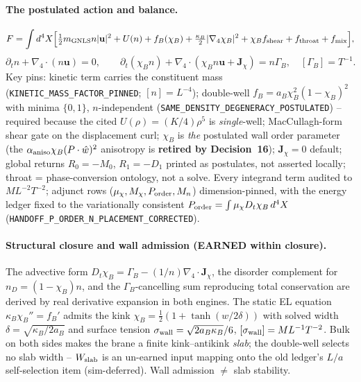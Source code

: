 \paragraph{The postulated action and balance.}
\[
  F=\int d^4X\Big[\tfrac12 m_{\mathrm{GNLS}} n|\mathbf u|^2+U(n)+f_B(\chi_B)
  +\tfrac{\kappa_B}{2}|\nabla_4\chi_B|^2+\chi_B f_{\rm shear}
  +f_{\rm throat}+f_{\rm mix}\Big],
\]
\[
  \partial_t n+\nabla_4\!\cdot\!(n\mathbf u)=0,\qquad
  \partial_t(\chi_B n)+\nabla_4\!\cdot\!(\chi_B n\mathbf u+\mathbf J_\chi)=n\Gamma_B,
  \quad [\Gamma_B]=T^{-1}.
\]
Key pins: kinetic term carries the constituent mass
(\texttt{KINETIC\_MASS\_FACTOR\_PINNED}; \([n]=L^{-4}\)); double-well
\(f_B=a_B\chi_B^2(1-\chi_B)^2\) with minima \(\{0,1\}\), \(n\)-independent
(\texttt{SAME\_DENSITY\_DEGENERACY\_POSTULATED}) -- required because the cited
\(U(\rho)=(K/4)\rho^5\) is \emph{single}-well; MacCullagh-form shear gate on the
displacement curl; \(\chi_B\) is \emph{the} postulated wall order parameter (the
\(\alpha_{\rm aniso}\chi_B(P\cdot\hat w)^2\) anisotropy is \textbf{retired by Decision~16});
\(\mathbf J_\chi=0\) default; global returns \(R_0=-M_0\), \(R_1=-D_1\) printed
as postulates, not asserted locally; throat = phase-conversion ontology, not a
solve. Every integrand term audited to \(ML^{-2}T^{-2}\); adjunct rows
(\(\mu_\chi, M_\chi, P_{\rm order}, M_n\)) dimension-pinned, with the
energy ledger fixed to the variationally consistent
\(P_{\rm order}=\int\mu_\chi D_t\chi_B\,d^4X\)
(\texttt{HANDOFF\_P\_ORDER\_N\_PLACEMENT\_CORRECTED}).

\paragraph{Structural closure and wall admission (EARNED within closure).}
The advective form \(D_t\chi_B=\Gamma_B-(1/n)\nabla_4\!\cdot\!\mathbf J_\chi\),
the disorder complement for \(n_D=(1-\chi_B)n\), and the \(\Gamma_B\)-cancelling
sum reproducing total conservation are derived by real derivative expansion in
both engines. The static EL equation \(\kappa_B\chi_B''=f_B'\) admits the kink
\(\chi_B=\tfrac12(1+\tanh(w/2\delta))\) with solved width
\(\delta=\sqrt{\kappa_B/2a_B}\) and surface tension
\(\sigma_{\rm wall}=\sqrt{2a_B\kappa_B}/6\), \([\sigma_{\rm wall}]=ML^{-1}T^{-2}\).
 Bulk on both sides makes the brane a finite
kink--antikink \emph{slab}; the double-well selects no slab width --
\(W_{\rm slab}\) is an un-earned input mapping onto the old ledger's \(L/a\)
self-selection item (sim-deferred). Wall admission \(\neq\) slab stability.

